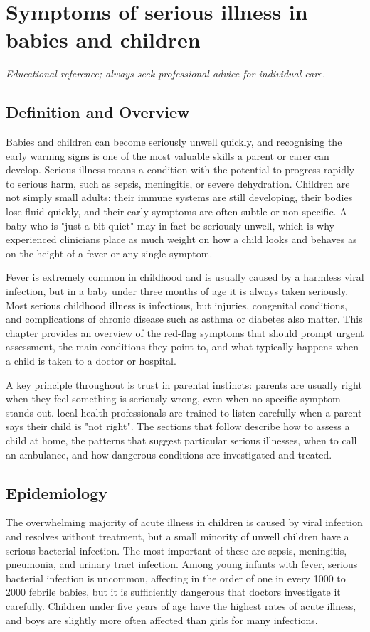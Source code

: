 \chapter{Symptoms of serious illness in babies and children}

\medskip
\noindent\textit{Educational reference; always seek professional advice for individual care.}

\section*{Definition and Overview}
Babies and children can become seriously unwell quickly, and recognising the early warning signs is one of the most valuable skills a parent or carer can develop. Serious illness means a condition with the potential to progress rapidly to serious harm, such as sepsis, meningitis, or severe dehydration. Children are not simply small adults: their immune systems are still developing, their bodies lose fluid quickly, and their early symptoms are often subtle or non-specific. A baby who is "just a bit quiet" may in fact be seriously unwell, which is why experienced clinicians place as much weight on how a child looks and behaves as on the height of a fever or any single symptom.

Fever is extremely common in childhood and is usually caused by a harmless viral infection, but in a baby under three months of age it is always taken seriously. Most serious childhood illness is infectious, but injuries, congenital conditions, and complications of chronic disease such as asthma or diabetes also matter. This chapter provides an overview of the red-flag symptoms that should prompt urgent assessment, the main conditions they point to, and what typically happens when a child is taken to a doctor or hospital.

A key principle throughout is trust in parental instincts: parents are usually right when they feel something is seriously wrong, even when no specific symptom stands out. local health professionals are trained to listen carefully when a parent says their child is "not right". The sections that follow describe how to assess a child at home, the patterns that suggest particular serious illnesses, when to call an ambulance, and how dangerous conditions are investigated and treated.

\section*{Epidemiology}
The overwhelming majority of acute illness in children is caused by viral infection and resolves without treatment, but a small minority of unwell children have a serious bacterial infection. The most important of these are sepsis, meningitis, pneumonia, and urinary tract infection. Among young infants with fever, serious bacterial infection is uncommon, affecting in the order of one in every 1000 to 2000 febrile babies, but it is sufficiently dangerous that doctors investigate it carefully. Children under five years of age have the highest rates of acute illness, and boys are slightly more often affected than girls for many infections.

